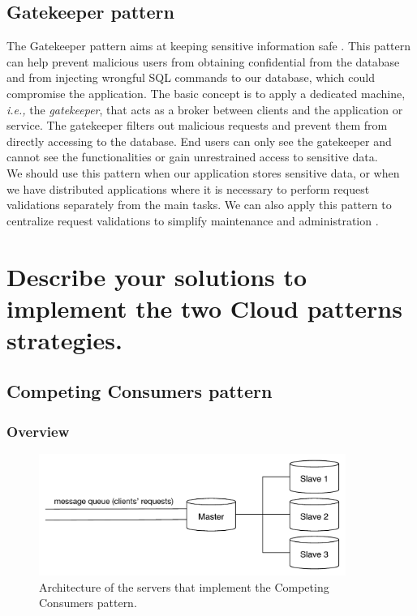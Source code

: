 \documentclass{article}
\begin{document}
\subsection{Gatekeeper pattern}
The Gatekeeper pattern aims at keeping sensitive information safe \cite{homer2014cloud}. This pattern can help prevent malicious users from obtaining confidential from the database and from injecting wrongful SQL commands to our database, which could compromise the application. The basic concept is to apply a dedicated machine, \emph{i.e.,} the \emph{gatekeeper}, that acts as a broker between clients and the application or service. The gatekeeper filters out malicious requests and prevent them from directly accessing to the database. End users can only see the gatekeeper and cannot see the functionalities or gain unrestrained access to sensitive data. \\

We should use this pattern when our application stores sensitive data,
or when we have distributed applications where it is necessary to perform request validations separately from the main tasks. We can also apply this pattern to centralize request validations to simplify maintenance and administration \cite{homer2014cloud}.


\section{Describe your solutions to implement the two Cloud patterns strategies.}\label{Q3}
\subsection{Competing Consumers pattern}
\subsubsection{Overview}

\begin{figure}[t]
    \centering
        \includegraphics[width = 10cm]{images/CCP.pdf}
    \caption{Architecture of the servers that implement the Competing Consumers pattern.}
    \label{fig:arch1}
\end{figure}
\end{document}
